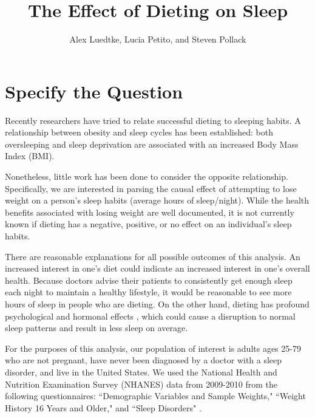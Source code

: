 \documentclass{article}
\begin{document}
%

\newcommand{\E}{\mathbb{E}}
\newcommand{\indp}{\ensuremath{\perp\hspace{-5pt}\perp}}
\newcommand{\M}{\mathcal{M}}
\newcommand{\given}{\; \mid \;}



\title{\textbf{The Effect of Dieting on Sleep}}
\author{Alex Luedtke, Lucia Petito, and Steven Pollack}
\date{}
\maketitle

\section{Specify the Question}

Recently researchers have tried to relate successful dieting to sleeping habits.  A relationship between obesity and sleep cycles has been established: both oversleeping \cite{sgain} and sleep deprivation \cite{sloss} are associated with an increased Body Mass Index (BMI). 

Nonetheless, little work has been done to consider the opposite relationship. Specifically, we are interested in parsing the causal effect of attempting to lose weight on a person's sleep habits (average hours of sleep/night). While the health benefits associated with losing weight are well documented, it is not currently known if dieting has a negative, positive, or no effect on an individual's sleep habits.

There are reasonable explanations for all possible outcomes of this analysis.  An increased interest in one's diet could indicate an increased interest in one's overall health.  Because doctors advise their patients to consistently get enough sleep each night to maintain a healthy lifestyle, it would be reasonable to see more hours of sleep in people who are dieting.  On the other hand, dieting has profound psychological and hormonal effects \cite{hormone}, which could cause a disruption to normal sleep patterns and result in less sleep on average.

For the purposes of this analysis, our population of interest is adults ages 25-79 who are not pregnant, have never been diagnosed by a doctor with a sleep disorder, and live in the United States.  We used the National Health and Nutrition Examination Survey (NHANES) data from 2009-2010 \cite{data} from the following questionnaires: ``Demographic Variables and Sample Weights," ``Weight History 16 Years and Older," and ``Sleep Disorders" \cite{questionnaire}.
\end{document}
